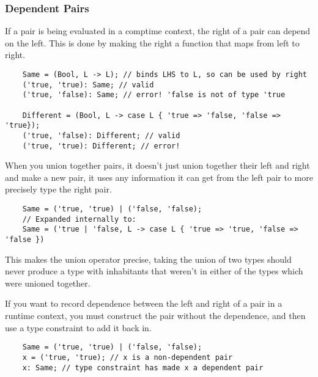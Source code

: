 \documentclass[12pt,twoside]{report}
\begin{document}
\subsubsection{Dependent Pairs}
If a pair is being evaluated in a comptime context, the right of a pair can depend on the left. This is done by making the right a function that maps from left to right.

  \begin{verbatim}
    Same = (Bool, L -> L); // binds LHS to L, so can be used by right
    ('true, 'true): Same; // valid
    ('true, 'false): Same; // error! 'false is not of type 'true

    Different = (Bool, L -> case L { 'true => 'false, 'false => 'true});
    ('true, 'false): Different; // valid
    ('true, 'true): Different; // error!
  \end{verbatim}

When you union together pairs, it doesn't just union together their left and right and make a new pair, it uses any information it can get from the left pair to more precisely type the right pair.

\begin{listing}[H]
  \begin{verbatim}
    Same = ('true, 'true) | ('false, 'false);
    // Expanded internally to:
    Same = ('true | 'false, L -> case L { 'true => 'true, 'false => 'false })
  \end{verbatim}
  \vspace{-0.5em}
  \caption{}
  \label{lst:same}
\end{listing}
\vspace{-1em}

This makes the union operator precise, taking the union of two types should never produce a type with inhabitants that weren't in either of the types which were unioned together.

If you want to record dependence between the left and right of a pair in a runtime context, you must construct the pair without the dependence, and then use a type constraint to add it back in.

\begin{listing}[H]
  \begin{verbatim}
    Same = ('true, 'true) | ('false, 'false);
    x = ('true, 'true); // x is a non-dependent pair
    x: Same; // type constraint has made x a dependent pair
  \end{verbatim}
\end{listing}
\end{document}
